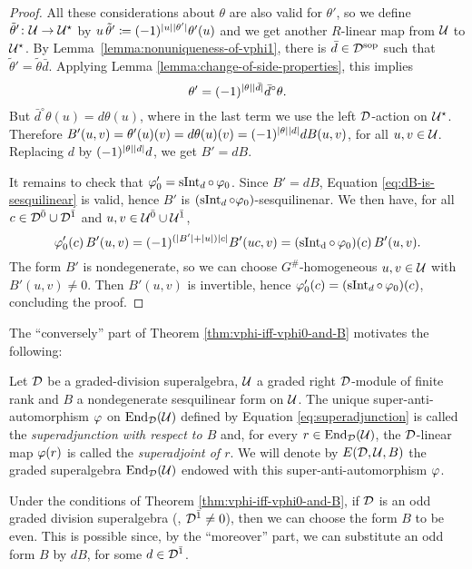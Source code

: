 \begin{proof}
	All these considerations about $\theta$ are also valid for $\theta'$, so we define $\tilde\theta'\colon \mathcal U \to \mathcal U^\star$ by $u\,\tilde\theta' \coloneqq (-1)^{|u||\theta'|} \theta'(u)$ and we get another $R$-linear map from $\mathcal U$ to $\mathcal U^\star$.
	By Lemma~\ref{lemma:nonuniqueness-of-vphi1}, there is $\bar d\in \mathcal{D}^{\mathrm{sop}}$ such that $\tilde\theta' = \tilde\theta \bar d$.
	Applying Lemma \ref{lemma:change-of-side-properties}, this implies \[\theta' = (-1)^{|\theta||\bar d|} \bar d^\circ \theta.\]
	But $\bar d^\circ \theta (u) = d\theta(u)$, where in the last term we use the left $\mathcal{D}$-action on $\mathcal U^\star$.
	Therefore $B'(u,v) = \theta'(u)(v) = d\theta(u)(v) = (-1)^{|\theta||d|} dB(u, v)$, for all $u,v \in \mathcal U$.
	Replacing $d$ by $(-1)^{|\theta||d|} d$, we get $B' = dB$.

	It remains to check that $\varphi_0' = \operatorname{sInt}_d \circ\, \varphi_0$.
	Since $B' = dB$, Equation \eqref{eq:dB-is-sesquilinear} is valid, hence $B'$ is $(\operatorname{sInt}_d \circ \varphi_0)$-sesquilinenar.
	We then have, for all $c\in \mathcal{D}^{\bar0} \cup \mathcal{D}^{\bar1}$ and $u,v \in \mathcal U^{\bar0} \cup \mathcal U^{\bar1}$,
	\[
		\varphi_0'(c)\, B'(u,v) = (-1)^{(|B'| + |u|) |c|} B'(uc,v) = (\operatorname{sInt_d} \circ\, \varphi_0) (c)\, B'(u,v).
	\]
	The form $B'$ is nondegenerate, so we can choose $G^\#$-homogeneous $u,v\in \mathcal U$ with $B'(u,v)\neq 0$. Then $B'(u,v)$ is invertible, hence $\varphi_0' (c) = (\operatorname{sInt}_d \circ\, \varphi_0) (c)$, concluding the proof.
\end{proof}

The ``conversely'' part of Theorem \ref{thm:vphi-iff-vphi0-and-B} motivates the following:

\begin{defi}\label{def:superadjunction}
	Let $\mathcal{D}$ be a graded-division superalgebra, $\mathcal U$ a graded right $\mathcal{D}$-module of finite rank and $B$ a nondegenerate sesquilinear form on $\mathcal U$.
	The unique super-anti-automorphism $\varphi$ on $\operatorname{End}_{\mathcal{D}}(\mathcal U)$ defined by Equation \eqref{eq:superadjunction} is called the \emph{superadjunction with respect to $B$} and, for every $r\in \operatorname{End}_{\mathcal{D}}(\mathcal U)$, the $\mathcal{D}$-linear map $\varphi(r)$ is called the \emph{superadjoint of $r$}. 
	We will denote by $E(\mathcal{D}, \mathcal U, B)$ the graded superalgebra $\operatorname{End}_{\mathcal{D}}(\mathcal U)$ endowed with this super-anti-automorphism $\varphi$. 
\end{defi}

\begin{remark}\label{conv:pick-even-form}
	Under the conditions of Theorem \ref{thm:vphi-iff-vphi0-and-B}, if $\mathcal{D}$ is an odd graded division superalgebra (\ie, $\mathcal{D}^{\bar1} \neq 0$), then we can choose the form $B$ to be even.
	This is possible since, by the ``moreover'' part, we can substitute an odd form $B$ by $dB$, for some $d\in \mathcal{D}^{\bar1}$.
\end{remark}

